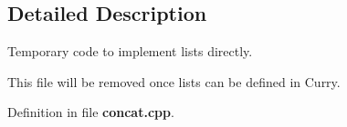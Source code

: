 \subsection{Detailed Description}
Temporary code to implement lists directly. 

This file will be removed once lists can be defined in Curry.

Definition in file {\bf concat.cpp}.